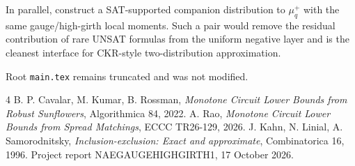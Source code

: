 \documentclass[11pt]{article}
\begin{document}
In parallel, construct a SAT-supported companion distribution to $\mu_q^+$ with the same gauge/high-girth local moments. Such a pair would remove the residual contribution of rare UNSAT formulas from the uniform negative layer and is the cleanest interface for CKR-style two-distribution approximation.

Root \texttt{main.tex} remains truncated and was not modified.

\begin{thebibliography}{4}
 B. P. Cavalar, M. Kumar, B. Rossman, \emph{Monotone Circuit Lower Bounds from Robust Sunflowers}, Algorithmica 84, 2022.
 A. Rao, \emph{Monotone Circuit Lower Bounds from Spread Matchings}, ECCC TR26-129, 2026.
 J. Kahn, N. Linial, A. Samorodnitsky, \emph{Inclusion-exclusion: Exact and approximate}, Combinatorica 16, 1996.
 Project report NAEGAUGEHIGHGIRTH1, 17 October 2026.
\end{thebibliography}
\end{document}
